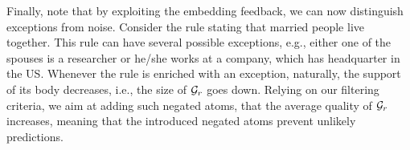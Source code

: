 Finally, note that by exploiting the embedding feedback, we can now distinguish exceptions from noise. 
Consider the rule stating that married people live together.  This rule can have several possible exceptions, e.g., either one of the spouses is a researcher or he/she works at a company, which has headquarter in the US. Whenever the rule is enriched with an exception, naturally, the support of its body decreases, i.e., the size of $\mathcal{G}_r$ goes down. 
Relying on our filtering criteria, we aim at 
adding such negated atoms, that the average quality of $\mathcal{G}_r$ increases, meaning that the introduced negated atoms prevent unlikely predictions.



